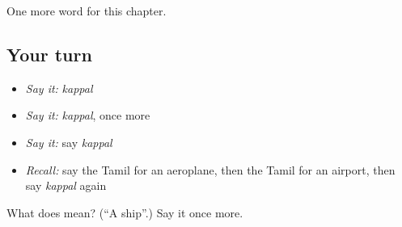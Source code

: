 \begin{grammarlens}[title={What you've built}]
One more word for this chapter.
\end{grammarlens}

\subsection*{Your turn}
\begin{itemize}
\raggedright
  \item \emph{Say it:} \emph{kappal}
  \item \emph{Say it:} \emph{kappal}, once more
  \item \emph{Say it:} say \emph{kappal}
  \item \emph{Recall:} say the Tamil for an aeroplane, then the Tamil for an airport, then say \emph{kappal} again
\end{itemize}

\begin{tcolorbox}[breakable,colback=teal!4,colframe=teal!35!black,title={Before you move on}]
What does  mean? (\textquotedblleft{}A ship\textquotedblright{}.) Say it once more.
\end{tcolorbox}
